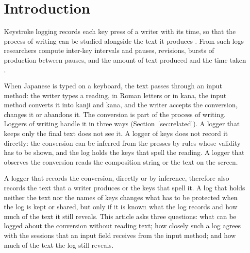 
\section{Introduction}
\label{sec:introduction}

Keystroke logging records each key press of a writer with its time, so that the process of writing can be studied
alongside the text it produces \citep{wengelin2023}. From such logs researchers compute inter-key intervals
and pauses, revisions, bursts of production between pauses, and the amount of text produced and the time taken
\citep{conijn2019}.

When Japanese is typed on a keyboard, the text passes through an input method: the writer types a reading, in Roman
letters or in kana, the input method converts it into kanji and kana, and the writer accepts the conversion, changes it
or abandons it. The conversion is part of the process of writing. Loggers of writing handle it in three ways
(Section~\ref{sec:related}). A logger that keeps only the final text does not see it. A logger of keys does not record
it directly: the conversion can be inferred from the presses by rules whose validity has to be shown, and the log holds
the keys that spell the reading. A logger that observes the conversion reads the composition string or the text on the
screen.

A logger that records the conversion, directly or by inference, therefore also records the text that a writer produces
or the keys that spell it. A log that holds neither the text nor the names of keys changes what has to be protected
when the log is kept or shared, but only if it is known what the log records and how much of the text it still reveals.
This article asks three questions: what can be logged about the conversion without reading text; how closely such a log
agrees with the sessions that an input field receives from the input method; and how much of the text the log still
reveals.

